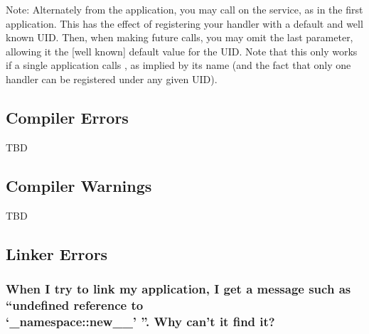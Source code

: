 Note: Alternately from the application, you may call 
on the service, as in the first  application.  This has the effect of
registering your handler with a default and well known UID.  Then, when
making future calls, you may omit the last parameter, allowing it 
the [well known] default value for the UID.  Note that this only works
if a single application calls , as 
implied by its name (and the fact that only one handler can be registered
under any given UID).

\subsection{Compiler Errors}
\label{faq:compiler_errors}

TBD

\subsection{Compiler Warnings}
\label{faq:compiler_warnings}

TBD

\subsection{Linker Errors}
\label{faq:linker_errors}

\subsubsection*{When I try to link my application, I get a message such
as ``undefined reference to\\
`\_namespace::new\_\_'
''.  Why can't it find it?}

